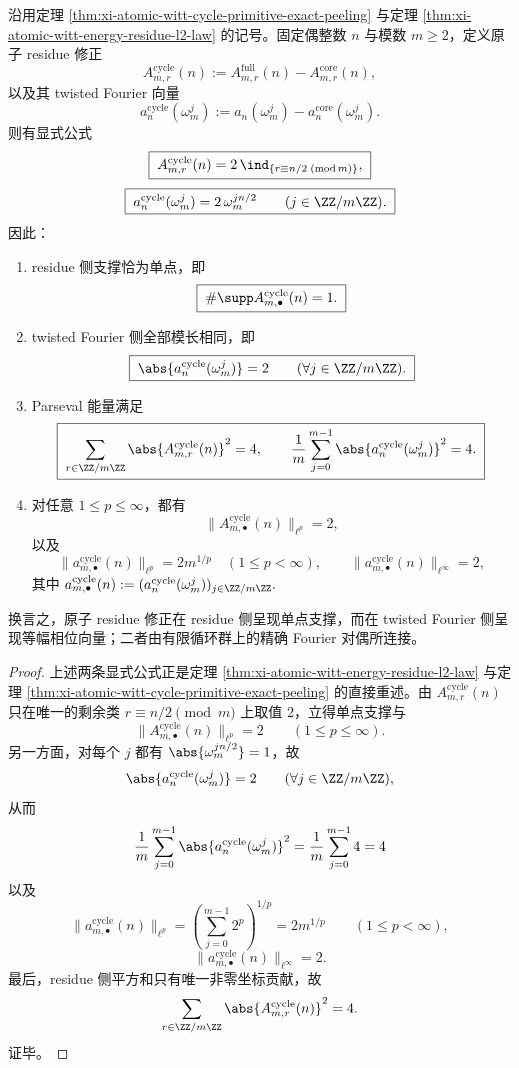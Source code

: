 \begin{conclusion}\label{con:xi-time-part57ba-atomic-residue-delta-flat-extremizer}
沿用定理 \ref{thm:xi-atomic-witt-cycle-primitive-exact-peeling} 与定理 \ref{thm:xi-atomic-witt-energy-residue-l2-law} 的记号。固定偶整数 \(n\) 与模数 \(m\ge 2\)，定义原子 residue 修正
\[
A_{m,r}^{\mathrm{cycle}}(n)
:=
A_{m,r}^{\mathrm{full}}(n)-A_{m,r}^{\mathrm{core}}(n),
\]
以及其 twisted Fourier 向量
\[
a_n^{\mathrm{cycle}}(\omega_m^j)
:=
a_n(\omega_m^j)-a_n^{\mathrm{core}}(\omega_m^j).
\]
则有显式公式
\[
\boxed{\;
A_{m,r}^{\mathrm{cycle}}(n)
=
2\,\ind_{\{r\equiv n/2\;(\mathrm{mod}\,m)\}},\;}
\]
\[
\boxed{\;
a_n^{\mathrm{cycle}}(\omega_m^j)=2\,\omega_m^{j n/2}\qquad(j\in\ZZ/m\ZZ).\;}
\]
因此：
\begin{enumerate}
  \item residue 侧支撑恰为单点，即
  \[
  \boxed{\;\#\supp A_{m,\bullet}^{\mathrm{cycle}}(n)=1.\;}
  \]
  \item twisted Fourier 侧全部模长相同，即
  \[
  \boxed{\;\abs{a_n^{\mathrm{cycle}}(\omega_m^j)}=2\qquad(\forall j\in\ZZ/m\ZZ).\;}
  \]
  \item Parseval 能量满足
  \[
  \boxed{\;
  \sum_{r\in\ZZ/m\ZZ}\abs{A_{m,r}^{\mathrm{cycle}}(n)}^2=4,\qquad
  \frac1m\sum_{j=0}^{m-1}\abs{a_n^{\mathrm{cycle}}(\omega_m^j)}^2=4.\;}
  \]
  \item 对任意 \(1\le p\le \infty\)，都有
  \[
  \boxed{\;\|A_{m,\bullet}^{\mathrm{cycle}}(n)\|_{\ell^p}=2,\;}
  \]
  以及
  \[
  \boxed{\;
  \|a_{m,\bullet}^{\mathrm{cycle}}(n)\|_{\ell^p}
  =
  2m^{1/p}\quad(1\le p<\infty),\qquad
  \|a_{m,\bullet}^{\mathrm{cycle}}(n)\|_{\ell^\infty}=2,\;}
  \]
  其中
  \(
  a_{m,\bullet}^{\mathrm{cycle}}(n):=
  (a_n^{\mathrm{cycle}}(\omega_m^j))_{j\in\ZZ/m\ZZ}.
  \)
\end{enumerate}
换言之，原子 residue 修正在 residue 侧呈现单点支撑，而在 twisted Fourier 侧呈现等幅相位向量；二者由有限循环群上的精确 Fourier 对偶所连接。
\end{conclusion}
\begin{proof}
上述两条显式公式正是定理 \ref{thm:xi-atomic-witt-energy-residue-l2-law} 与定理 \ref{thm:xi-atomic-witt-cycle-primitive-exact-peeling} 的直接重述。由 \(A_{m,r}^{\mathrm{cycle}}(n)\) 只在唯一的剩余类 \(r\equiv n/2\pmod m\) 上取值 \(2\)，立得单点支撑与
\[
\|A_{m,\bullet}^{\mathrm{cycle}}(n)\|_{\ell^p}=2
\qquad(1\le p\le \infty).
\]
另一方面，对每个 \(j\) 都有 \(\abs{\omega_m^{j n/2}}=1\)，故
\[
\abs{a_n^{\mathrm{cycle}}(\omega_m^j)}=2
\qquad(\forall j\in\ZZ/m\ZZ),
\]
从而
\[
\frac1m\sum_{j=0}^{m-1}\abs{a_n^{\mathrm{cycle}}(\omega_m^j)}^2
=
\frac1m\sum_{j=0}^{m-1}4
=
4
\]
以及
\[
\|a_{m,\bullet}^{\mathrm{cycle}}(n)\|_{\ell^p}
=
\left(\sum_{j=0}^{m-1}2^p\right)^{1/p}
=
2m^{1/p}
\qquad(1\le p<\infty),
\]
\[
\|a_{m,\bullet}^{\mathrm{cycle}}(n)\|_{\ell^\infty}=2.
\]
最后，residue 侧平方和只有唯一非零坐标贡献，故
\[
\sum_{r\in\ZZ/m\ZZ}\abs{A_{m,r}^{\mathrm{cycle}}(n)}^2=4.
\]
证毕。
\end{proof}

